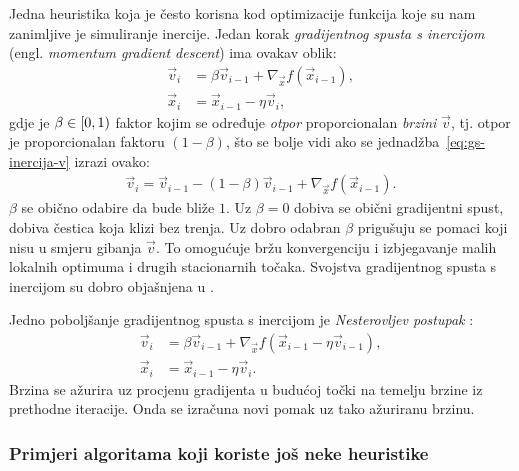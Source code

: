 \documentclass[utf8, diplomski, lmodern]{fer}
\begin{document}
Jedna heuristika koja je često korisna kod optimizacije funkcija koje su nam zanimljive je simuliranje inercije. Jedan korak \emph{gradijentnog spusta s inercijom} (engl. \textit{momentum gradient descent}) ima ovakav oblik:
\begin{align}
\vec v_i &= \beta\vec v_{i-1} + \nabla_{\vec x}f(\vec x_{i-1}), \label{eq:gs-inercija-v}\\
\vec x_i &= \vec x_{i-1} - \eta\vec v_i \text{,}
\end{align}
gdje je $\beta\in\intco{0,1}$ faktor kojim se određuje \textit{otpor} proporcionalan \textit{brzini} $\vec v$, tj. otpor je proporcionalan faktoru $(1-\beta)$, što se bolje vidi ako se jednadžba~\eqref{eq:gs-inercija-v} izrazi ovako: 
\begin{align}
\vec v_i = \vec v_{i-1} - (1-\beta)\vec v_{i-1} + \nabla_{\vec x}f(\vec x_{i-1}) \text{.}
\end{align}
$\beta$ se obično odabire da bude bliže $1$. Uz $\beta=0$ dobiva se obični gradijentni spust, dobiva čestica koja klizi bez trenja. Uz dobro odabran $\beta$ prigušuju se pomaci koji nisu u smjeru gibanja $\vec v$. To omogućuje bržu konvergenciju i izbjegavanje malih lokalnih optimuma i drugih stacionarnih točaka. Svojstva gradijentnog spusta s inercijom su dobro objašnjena u \citet{GOH:2017:WMRW}.

Jedno poboljšanje gradijentnog spusta s inercijom je \emph{Nesterovljev postupak} \citep{Nesterov:2014:ILCOBC,Sutskever:2013:TRNN}:
\begin{align}
\vec v_i &= \beta\vec v_{i-1} + \nabla_{\vec x}f(\vec x_{i-1} - \eta\vec v_{i-1}), \\
\vec x_i &= \vec x_{i-1} - \eta\vec v_i \text{.}
\end{align}
Brzina se ažurira uz procjenu gradijenta u budućoj točki na temelju brzine iz prethodne iteracije. Onda se izračuna novi pomak uz tako ažuriranu brzinu.

\subsubsection{Primjeri algoritama koji koriste još neke heuristike}
\end{document}
